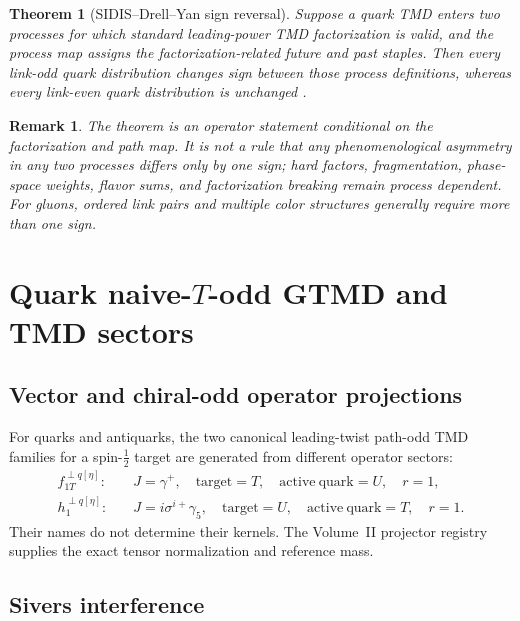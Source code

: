 \documentclass[11pt]{article}
\newtheorem{theorem}[definition]{Theorem}
\newtheorem{remark}[definition]{Remark}
\begin{document}
\begin{theorem}[SIDIS--Drell--Yan sign reversal]
\label{thm:sidis-dy-sign}
Suppose a quark TMD enters two processes for which standard leading-power TMD
factorization is valid, and the process map assigns the factorization-related
future and past staples.  Then every link-odd quark distribution changes sign
between those process definitions, whereas every link-even quark distribution
is unchanged \cite{Collins2002,JiMaYuanSpin2004}.
\end{theorem}

\begin{remark}
The theorem is an operator statement conditional on the factorization and
path map.  It is not a rule that any phenomenological asymmetry in any two
processes differs only by one sign; hard factors, fragmentation, phase-space
weights, flavor sums, and factorization breaking remain process dependent.
For gluons, ordered link pairs and multiple color structures generally require
more than one sign.
\end{remark}

\section{Quark naive-\texorpdfstring{\(T\)}{T}-odd GTMD and TMD sectors}
\label{sec:quark-todd}

\subsection{Vector and chiral-odd operator projections}

For quarks and antiquarks, the two canonical leading-twist path-odd TMD
families for a spin-\(\tfrac12\) target are generated from different operator
sectors:
\begin{align}
 f_{1T}^{\perp q[\eta]}:
 &\quad J=\gamma^+,
 \quad \mathrm{target}=T,
 \quad \mathrm{active\ quark}=U,
 \quad r=1,
\label{eq:sivers-identity}\\
 h_1^{\perp q[\eta]}:
 &\quad J=i\sigma^{i+}\gamma_5,
 \quad \mathrm{target}=U,
 \quad \mathrm{active\ quark}=T,
 \quad r=1.
\label{eq:boer-mulders-identity}
\end{align}
Their names do not determine their kernels.  The Volume~II projector registry
supplies the exact tensor normalization and reference mass.

\subsection{Sivers interference}
\end{document}
